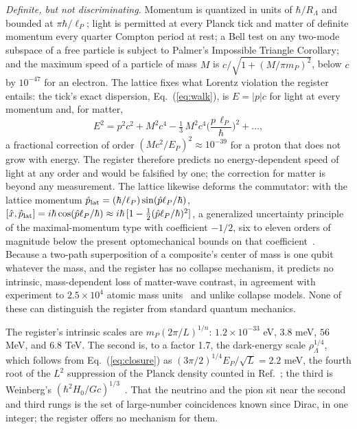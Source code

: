 \documentclass[aps,prd,twocolumn,superscriptaddress,nofootinbib]{revtex4-2}
\begin{document}
\textit{Definite, but not discriminating.} Momentum is quantized in units of $\hbar/R_\Lambda$ and bounded at $\pi\hbar/\ell_P$; light is permitted at every Planck tick and matter of definite momentum every quarter Compton period at rest; a Bell test on any two-mode subspace of a free particle is subject to Palmer's Impossible Triangle Corollary; and the maximum speed of a particle of mass $M$ is $c/\sqrt{1 + (M/\pi m_P)^2}$, below $c$ by $10^{-47}$ for an electron. The lattice fixes what Lorentz violation the register entails: the tick's exact dispersion, Eq.~(\ref{eq:walk}), is $E = |p|c$ for light at every momentum and, for matter,
\begin{equation}
E^2 = p^2c^2 + M^2c^4 - \tfrac{1}{3}\,M^2c^4\Big(\frac{p\,\ell_P}{\hbar}\Big)^2 + \dots ,
\label{eq:lattice}
\end{equation}
a fractional correction of order $(Mc^2/E_P)^2 \approx 10^{-39}$ for a proton that does not grow with energy. The register therefore predicts no energy-dependent speed of light at any order and would be falsified by one; the correction for matter is beyond any measurement. The lattice likewise deforms the commutator: with the lattice momentum $\hat p_{\rm lat} = (\hbar/\ell_P)\sin(\hat p\ell_P/\hbar)$, $[\hat x,\hat p_{\rm lat}] = i\hbar\cos(\hat p\ell_P/\hbar) \approx i\hbar\,[1 - \tfrac12(\hat p\ell_P/\hbar)^2]$, a generalized uncertainty principle of the maximal-momentum type with coefficient $-1/2$, six to eleven orders of magnitude below the present optomechanical bounds on that coefficient~\cite{pikovski2012}. Because a two-path superposition of a composite's center of mass is one qubit whatever the mass, and the register has no collapse mechanism, it predicts no intrinsic, mass-dependent loss of matter-wave contrast, in agreement with experiment to $2.5\times10^4$ atomic mass units~\cite{fein2019} and unlike collapse models. None of these can distinguish the register from standard quantum mechanics.

The register's intrinsic scales are $m_P(2\pi/L)^{1/n}$: $1.2\times10^{-33}$ eV, $3.8$ meV, $56$ MeV, and $6.8$ TeV. The second is, to a factor 1.7, the dark-energy scale $\rho_\Lambda^{1/4}$, which follows from Eq.~(\ref{eq:closure}) as $(3\pi/2)^{1/4}E_P/\sqrt L = 2.2$ meV, the fourth root of the $L^2$ suppression of the Planck density counted in Ref.~\cite{korytko2026b}; the third is Weinberg's $(\hbar^2H_0/Gc)^{1/3}$~\cite{weinberg1972}. That the neutrino and the pion sit near the second and third rungs is the set of large-number coincidences known since Dirac, in one integer; the register offers no mechanism for them.
\end{document}
